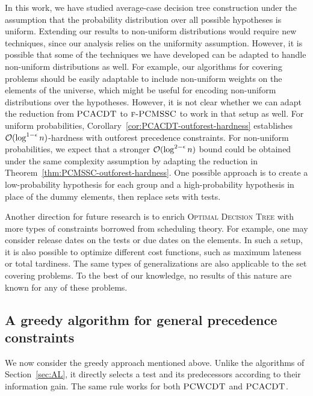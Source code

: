 In this work, we have studied average-case decision tree construction under the assumption that the probability distribution over all possible hypotheses is uniform. Extending our results to non-uniform distributions would require new techniques, since our analysis relies on the uniformity assumption. However, it is possible that some of the techniques we have developed can be adapted to handle non-uniform distributions as well. For example, our algorithms for covering problems should be easily adaptable to include non-uniform weights on the elements of the universe, which might be useful for encoding non-uniform distributions over the hypotheses. However, it is not clear whether we can adapt the reduction from $\textup{\textsc{PCACDT}}$ to $\textup{\textsc{f-PCMSSC}}$ to work in that setup as well. For uniform probabilities, Corollary~\ref{cor:PCACDT-outforest-hardness} establishes $\mathcal{O}(\log^{1-\epsilon} n)$-hardness with outforest precedence constraints. For non-uniform probabilities, we expect that a stronger $\mathcal{O}(\log^{2-\epsilon} n)$ bound could be obtained under the same complexity assumption by adapting the reduction in Theorem~\ref{thm:PCMSSC-outforest-hardness}. One possible approach is to create a low-probability hypothesis for each group and a high-probability hypothesis in place of the dummy elements, then replace sets with tests.

Another direction for future research is to enrich \textup{\textsc{Optimal Decision Tree}} with more types of constraints borrowed from scheduling theory. For example, one may consider release dates on the tests or due dates on the elements. In such a setup, it is also possible to optimize different cost functions, such as maximum lateness or total tardiness. The same types of generalizations are also applicable to the set covering problems. To the best of our knowledge, no results of this nature are known for any of these problems.

\subsection{A greedy algorithm for general precedence constraints}

We now consider the greedy approach mentioned above. Unlike the algorithms of Section~\ref{sec:AL}, it directly selects a test and its predecessors according to their information gain. The same rule works for both $\textup{\textsc{PCWCDT}}$ and $\textup{\textsc{PCACDT}}$.

